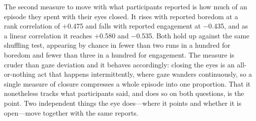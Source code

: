 
The second measure to move with what participants reported is how much of an episode they spent
with their eyes closed. It rises with reported boredom at a rank correlation of $+$0.475 and
falls with reported engagement at $-$0.435, and as a linear correlation it reaches $+$0.580 and
$-$0.535. Both hold up against the same shuffling test, appearing by chance in fewer than two
runs in a hundred for boredom and fewer than three in a hundred for engagement. The measure is
cruder than gaze deviation and it behaves accordingly: closing the eyes is an all-or-nothing act
that happens intermittently, where gaze wanders continuously, so a single measure of closure
compresses a whole episode into one proportion. That it nonetheless tracks what participants
said, and does so on both questions, is the point. Two independent things the eye does---where
it points and whether it is open---move together with the same reports.

